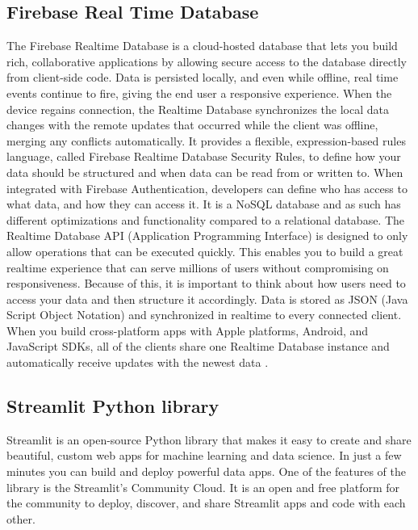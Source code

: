 \documentclass[conference]{IEEEtran}
\begin{document}
\subsection{Firebase Real Time Database}
The Firebase Realtime Database is a cloud-hosted database that lets you build rich, collaborative
applications by allowing secure access to the database directly from client-side code. Data is
persisted locally, and even while offline, real time events continue to fire, giving the end user a
responsive experience. When the device regains connection, the Realtime Database synchronizes
the local data changes with the remote updates that occurred while the client was offline, merging
any conflicts automatically. It provides a flexible, expression-based rules language, called Firebase
Realtime Database Security Rules, to define how your data should be structured and when data
can be read from or written to. When integrated with Firebase Authentication, developers can
define who has access to what data, and how they can access it. It is a NoSQL database and as
such has different optimizations and functionality compared to a relational database. The Realtime
Database API (Application Programming Interface) is designed to only allow operations that can be executed quickly. This enables you
to build a great realtime experience that can serve millions of users without compromising on
responsiveness. Because of this, it is important to think about how users need to access your data
and then structure it accordingly. Data is stored as JSON (Java Script Object Notation) and synchronized in realtime to every
connected client. When you build cross-platform apps with Apple platforms, Android, and
JavaScript SDKs, all of the clients share one Realtime Database instance and automatically receive
updates with the newest data \cite{b3}. 

\subsection{Streamlit Python library \cite{streamlit}}
Streamlit is an open-source Python library that makes it easy to create and share beautiful, custom web apps for machine learning and data science. In just a few minutes you can build and deploy powerful data apps. One of the features of the library is the  Streamlit's Community Cloud. It is an open and free platform for the community to deploy, discover, and share Streamlit apps and code with each other.
\end{document}
